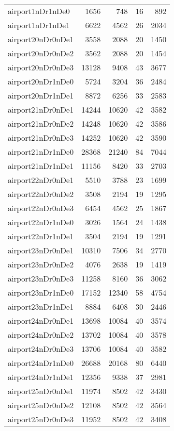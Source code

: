 \begin{tabular}{lrrrr}
airport1nDr1nDe0 & 1656 & 748 & 16 & 892 \\
airport1nDr1nDe1 & 6622 & 4562 & 26 & 2034 \\
airport20nDr0nDe1 & 3558 & 2088 & 20 & 1450 \\
airport20nDr0nDe2 & 3562 & 2088 & 20 & 1454 \\
airport20nDr0nDe3 & 13128 & 9408 & 43 & 3677 \\
airport20nDr1nDe0 & 5724 & 3204 & 36 & 2484 \\
airport20nDr1nDe1 & 8872 & 6256 & 33 & 2583 \\
airport21nDr0nDe1 & 14244 & 10620 & 42 & 3582 \\
airport21nDr0nDe2 & 14248 & 10620 & 42 & 3586 \\
airport21nDr0nDe3 & 14252 & 10620 & 42 & 3590 \\
airport21nDr1nDe0 & 28368 & 21240 & 84 & 7044 \\
airport21nDr1nDe1 & 11156 & 8420 & 33 & 2703 \\
airport22nDr0nDe1 & 5510 & 3788 & 23 & 1699 \\
airport22nDr0nDe2 & 3508 & 2194 & 19 & 1295 \\
airport22nDr0nDe3 & 6454 & 4562 & 25 & 1867 \\
airport22nDr1nDe0 & 3026 & 1564 & 24 & 1438 \\
airport22nDr1nDe1 & 3504 & 2194 & 19 & 1291 \\
airport23nDr0nDe1 & 10310 & 7506 & 34 & 2770 \\
airport23nDr0nDe2 & 4076 & 2638 & 19 & 1419 \\
airport23nDr0nDe3 & 11258 & 8160 & 36 & 3062 \\
airport23nDr1nDe0 & 17152 & 12340 & 58 & 4754 \\
airport23nDr1nDe1 & 8884 & 6408 & 30 & 2446 \\
airport24nDr0nDe1 & 13698 & 10084 & 40 & 3574 \\
airport24nDr0nDe2 & 13702 & 10084 & 40 & 3578 \\
airport24nDr0nDe3 & 13706 & 10084 & 40 & 3582 \\
airport24nDr1nDe0 & 26688 & 20168 & 80 & 6440 \\
airport24nDr1nDe1 & 12356 & 9338 & 37 & 2981 \\
airport25nDr0nDe1 & 11974 & 8502 & 42 & 3430 \\
airport25nDr0nDe2 & 12108 & 8502 & 42 & 3564 \\
airport25nDr0nDe3 & 11952 & 8502 & 42 & 3408 \\

\end{tabular}
